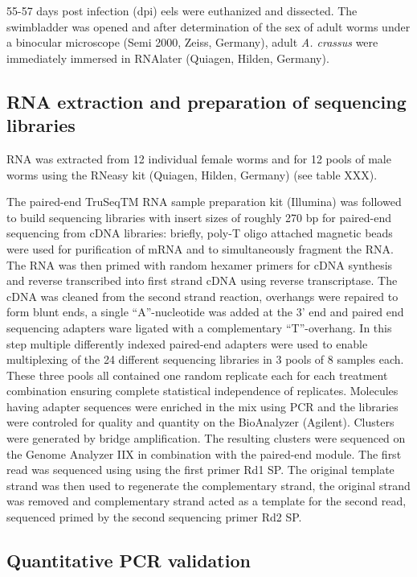 \documentclass[10pt]{article}
\begin{document}
55-57 days post infection (dpi) eels were euthanized and dissected.
The swimbladder was opened and after determination of the sex of adult
worms under a binocular microscope (Semi 2000, Zeiss, Germany), adult
\textit{A. crassus} were immediately immersed in RNAlater (Quiagen,
Hilden, Germany).

\subsection{RNA extraction and preparation of sequencing libraries}

RNA was extracted from 12 individual female worms and for 12 pools of
male worms using the RNeasy kit (Quiagen, Hilden, Germany) (see
table XXX).

The paired-end TruSeqTM RNA sample preparation kit (Illumina) was
followed to build sequencing libraries with insert sizes of roughly
270 bp for paired-end sequencing from cDNA libraries: briefly, poly-T
oligo attached magnetic beads were used for purification of mRNA and
to simultaneously fragment the RNA. The RNA was then primed with
random hexamer primers for cDNA synthesis and reverse transcribed into
first strand cDNA using reverse transcriptase. The cDNA was cleaned
from the second strand reaction, overhangs were repaired to form blunt
ends, a single ``A''-nucleotide was added at the 3' end and paired end
sequencing adapters ware ligated with a complementary
``T''-overhang. In this step multiple differently indexed paired-end
adapters were used to enable multiplexing of the 24 different
sequencing libraries in 3 pools of 8 samples each. These three pools
all contained one random replicate each for each treatment combination
ensuring complete statistical independence of replicates. Molecules
having adapter sequences were enriched in the mix using PCR and the
libraries were controled for quality and quantity on the BioAnalyzer
(Agilent). Clusters were generated by bridge amplification. The
resulting clusters were sequenced on the Genome Analyzer IIX in
combination with the paired-end module. The first read was sequenced
using using the first primer Rd1 SP. The original template strand was
then used to regenerate the complementary strand, the original strand
was removed and complementary strand acted as a template for the
second read, sequenced primed by the second sequencing primer Rd2 SP.

\subsection{Quantitative PCR validation}
\end{document}
